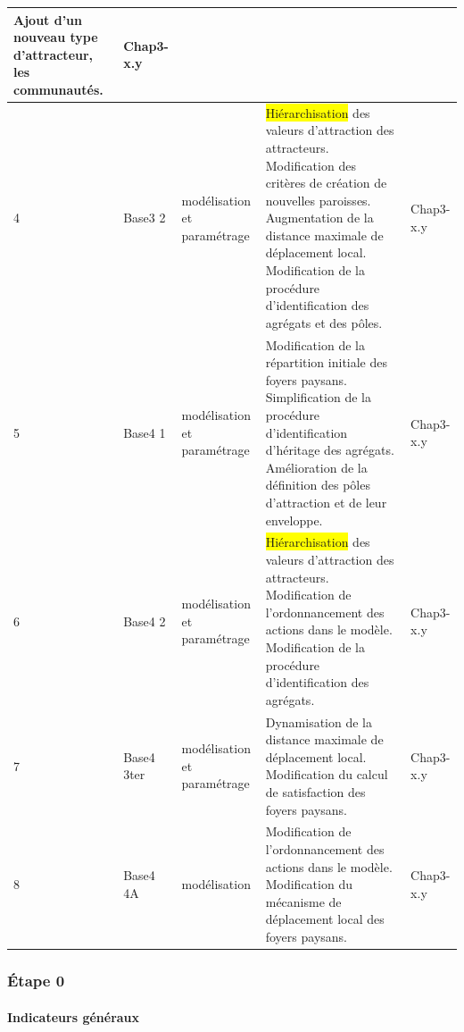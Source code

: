 \begin{footnotesize}
\begin{longtable}{ m{} m{}  m{}  m{}  m{}  }
		Ajout d'un nouveau type d'attracteur, les communautés. & Chap3-x.y\\
		\hline
		4 & Base3 2 & modélisation et paramétrage & \colorbox{yellow}{Hiérarchisation} des valeurs d'attraction des attracteurs. \newline
		Modification des critères de création de nouvelles paroisses. \newline
		Augmentation de la distance maximale de déplacement local. \newline
		Modification de la procédure d'identification des agrégats et des pôles. & Chap3-x.y\\
		\hline
		5 & Base4 1 & modélisation et paramétrage & 
		Modification de la répartition initiale des foyers paysans.\newline
		Simplification de la procédure d'identification d'héritage des agrégats.
		Amélioration de la définition des pôles d'attraction et de leur enveloppe. & Chap3-x.y\\
		\hline
		6 & Base4 2 & modélisation et paramétrage & \colorbox{yellow}{Hiérarchisation} des valeurs d'attraction des attracteurs. \newline
		Modification de l'ordonnancement des actions dans le modèle.\newline
		Modification de la procédure d'identification des agrégats. & Chap3-x.y\\
		\hline
		7 & Base4 3ter & modélisation et paramétrage &
		Dynamisation de la distance maximale de déplacement local.\newline
		Modification du calcul de satisfaction des foyers paysans. & Chap3-x.y\\
		\hline
		8 & Base4 4A & modélisation & Modification de l'ordonnancement des actions dans le modèle.\newline
		Modification du mécanisme de déplacement local des foyers paysans. & Chap3-x.y\\
		\hline
					
	\end{longtable}
\end{footnotesize}

\subsubsection{Étape 0}
	
\paragraph{Indicateurs généraux}
	
